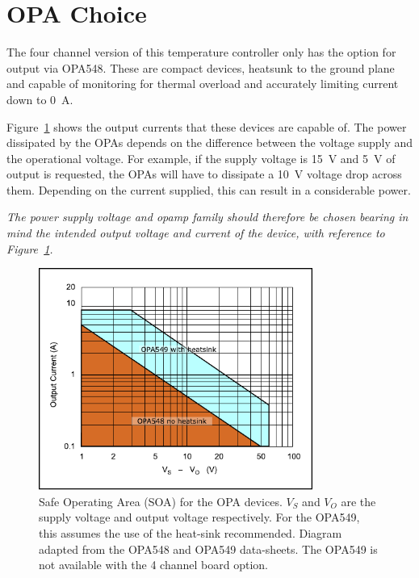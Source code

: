 \documentclass[11pt]{report}
\begin{document}
\section{OPA Choice} %
\label{sub:opa_choice}

The four channel version of this temperature controller only has the option for output via OPA548. These are compact devices, heatsunk to the ground plane and capable of monitoring for thermal overload and accurately limiting current down to \SI{0}{A}. 

Figure~\ref{fig:OPA_SOA} shows the output currents that these devices are capable of. The power dissipated by the OPAs depends on the difference between the voltage supply and the operational voltage. For example, if the supply voltage is \SI{15}{\volt} and \SI{5}{\volt} of output is requested, the OPAs will have to dissipate a \SI{10}{\volt} voltage drop across them. Depending on the current supplied, this can result in a considerable power.

\textit{The power supply voltage and opamp family should therefore be chosen bearing in mind the intended output voltage and current of the device, with reference to Figure~\ref{fig:OPA_SOA}. }

\begin{figure}[tb]
	\centering
	\includegraphics[width=0.8\textwidth]{OPA_SOAs/OPA_SOA}
	\caption{Safe Operating Area (SOA) for the OPA devices. $V_S$ and $V_O$ are the supply voltage and output voltage respectively. For the OPA549, this assumes the use of the heat-sink recommended. Diagram adapted from the OPA548 and OPA549 data-sheets. The OPA549 is not available with the 4 channel board option. }
	\label{fig:OPA_SOA}
\end{figure}
\end{document}
